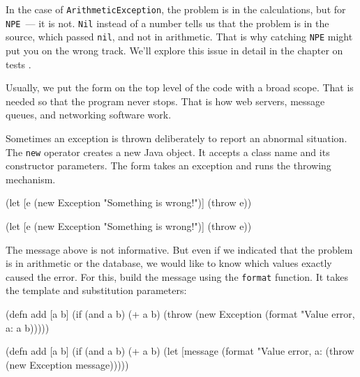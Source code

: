 In the case of \verb|ArithmeticException|, the problem is in the calculations, but for \verb|NPE|~--- it is not. \verb|Nil| instead of a number tells us that the problem is in the source, which passed \verb|nil|, and not in arithmetic. That is why catching \verb|NPE| might put you on the wrong track. We'll explore this issue in detail in the chapter on tests .

Usually, we put the  form on the top level of the code with a broad scope. That is needed so that the program never stops. That is how web servers, message queues, and networking software work.


Sometimes an exception is thrown deliberately to report an abnormal situation. The \verb|new| operator creates a new Java object. It accepts a class name and its constructor parameters. The  form takes an exception and runs the throwing mechanism.

\ifnarrow

\begin{clojure}
(let [e (new Exception
          "Something is wrong!")]
  (throw e))
\end{clojure}

\else

\begin{clojure}
(let [e (new Exception "Something is wrong!")]
  (throw e))
\end{clojure}

\fi

The message above is not informative. But even if we indicated that the problem is in arithmetic or the database, we would like to know which values exactly caused the error. For this, build the message using the \verb|format| function. It takes the template and substitution parameters:


\ifnarrow

\begin{english}
  \begin{clojure}
(defn add [a b]
  (if (and a b)
    (+ a b)
    (throw
      (new Exception
        (format
          "Value error, a: %
          a b)))))
  \end{clojure}
\end{english}

\else

\begin{english}
  \begin{clojure}
(defn add [a b]
  (if (and a b)
    (+ a b)
    (let [message
          (format "Value error, a: %
      (throw (new Exception message)))))
  \end{clojure}
\end{english}

